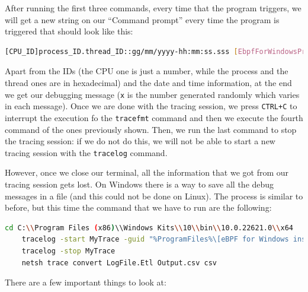 After running the first three commands, every time that the program triggers, we will get a new string on our ``Command prompt'' every time the program is triggered that should look like this:

\begin{lstlisting}[style=commandline, language=bash, caption={tracelog real time message output}]
	[CPU_ID]process_ID.thread_ID::gg/mm/yyyy-hh:mm:ss.sss [EbpfForWindowsProvider]{"Message":"Hello World x!"}
\end{lstlisting}

Apart from the IDs (the CPU one is just a number, while the process and the thread ones are in hexadecimal) and the date and time information, at the end we get our debugging message (\colorbox{backcolour}{\lstinline[style=cstyle, language=C]|x|} is the number generated randomly which varies in each message).
Once we are done with the tracing session, we press \colorbox{backcolour}{\lstinline[style=commandline, language=bash]|CTRL+C|} to interrupt the execution fo the \colorbox{backcolour}{\lstinline[style=commandline, language=bash]|tracefmt|} command and then we execute the fourth command of the ones previously shown.
Then, we run the last command to stop the tracing session: if we do not do this, we will not be able to start a new tracing session with the \colorbox{backcolour}{\lstinline[style=commandline, language=bash]|tracelog|} command.

However, once we close our terminal, all the information that we got from our tracing session gets lost.
On Windows there is a way to save all the debug messages in a file (and this could not be done on Linux).
The process is similar to before, but this time the command that we have to run are the following:

\begin{lstlisting}[style=commandline, language=bash, caption={tracelog kernel debugging commands}]
	cd C:\\Program Files (x86)\\Windows Kits\\10\\bin\\10.0.22621.0\\x64
	tracelog -start MyTrace -guid "%ProgramFiles%\[eBPF for Windows install folder]\ebpf-printk.guid" -kd
	tracelog -stop MyTrace
	netsh trace convert LogFile.Etl Output.csv csv
\end{lstlisting}

There are a few important things to look at:

